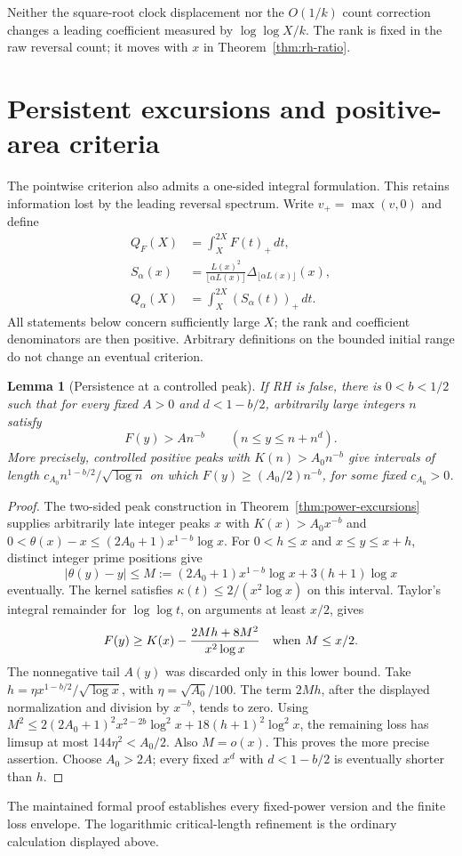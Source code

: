 \documentclass[11pt]{article}
\newtheorem{lemma}[theorem]{Lemma}
\theoremstyle{definition}
\begin{document}
Neither the square-root clock displacement nor the $O(1/k)$
count correction changes a leading coefficient measured by
$\log\log X/k$. The rank is fixed in the raw reversal count;
it moves with $x$ in Theorem~\ref{thm:rh-ratio}.

\section{Persistent excursions and positive-area criteria}\label{sec:area}
The pointwise criterion also admits a one-sided integral formulation.
This retains information lost by the leading reversal spectrum.
Write $v_+=\max(v,0)$ and define
\begin{align*}
 Q_F(X)&=\int_X^{2X}F(t)_+\,dt,\\
 S_\alpha(x)&=\frac{L(x)^2}{\lfloor\alpha L(x)\rfloor}
                \Delta_{\lfloor\alpha L(x)\rfloor}(x),\\
 Q_\alpha(X)&=\int_X^{2X}(S_\alpha(t))_+\,dt .
\end{align*}
All statements below concern sufficiently large $X$; the rank and
coefficient denominators are then positive. Arbitrary definitions on
the bounded initial range do not change an eventual criterion.

\begin{lemma}[Persistence at a controlled peak]\label{lem:persistence}
If RH is false, there is $0<b<1/2$ such that for every fixed
$A>0$ and $d<1-b/2$, arbitrarily large integers $n$ satisfy
\[
 F(y)>A n^{-b}\qquad(n\le y\le n+n^d).
\]
More precisely, controlled positive peaks with $K(n)>A_0n^{-b}$
give intervals of length
$c_{A_0}n^{1-b/2}/\sqrt{\log n}$ on which
$F(y)\ge(A_0/2)n^{-b}$, for some fixed $c_{A_0}>0$.
\end{lemma}
\begin{proof}
The two-sided peak construction in
Theorem~\ref{thm:power-excursions} supplies arbitrarily late integer
peaks $x$ with $K(x)>A_0x^{-b}$ and
$0<\theta(x)-x\le(2A_0+1)x^{1-b}\log x$.
For $0<h\le x$ and $x\le y\le x+h$, distinct integer prime
positions give
\[
 |\theta(y)-y|\le M:=(2A_0+1)x^{1-b}\log x+3(h+1)\log x
\]
eventually. The kernel satisfies
$\kappa(t)\le2/(x^2\log x)$ on this interval.
Taylor's integral remainder for $\log\log t$, on arguments at
least $x/2$, gives
\[
 F(y)\ge K(x)-\frac{2Mh+8M^2}{x^2\log x}
 \quad\hbox{when }M\le x/2.
\]
The nonnegative tail $A(y)$ was discarded only in this lower bound.
Take $h=\eta x^{1-b/2}/\sqrt{\log x}$, with
$\eta=\sqrt{A_0}/100$. The term $2Mh$, after the displayed
normalization and division by $x^{-b}$, tends to zero.
Using
$M^2\le2(2A_0+1)^2x^{2-2b}\log^2x+
18(h+1)^2\log^2x$, the remaining loss has limsup at most
$144\eta^2<A_0/2$. Also $M=o(x)$.
This proves the more precise assertion. Choose $A_0>2A$;
every fixed $x^d$ with $d<1-b/2$ is eventually shorter than $h$.
\end{proof}
The maintained formal proof establishes every fixed-power version
and the finite loss envelope. The logarithmic critical-length
refinement is the ordinary calculation displayed above.
\end{document}
